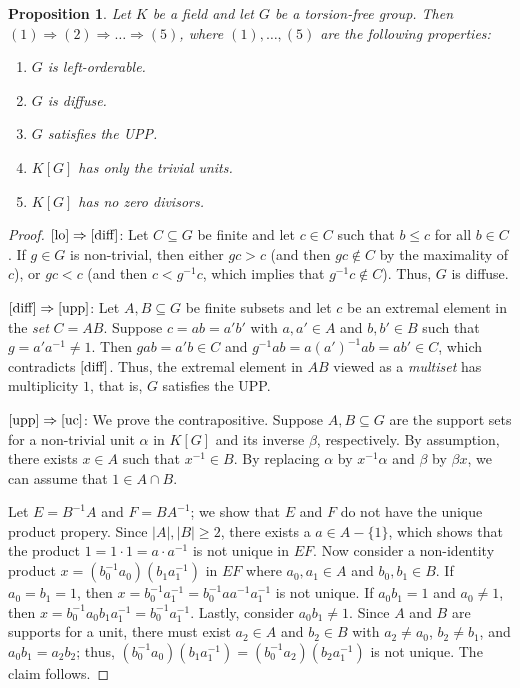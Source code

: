 \documentclass[11pt]{amsart}
\theoremstyle{mythm}
\newtheorem{proposition}[theorem]{Proposition}
\theoremstyle{mydef}
\theoremstyle{myrem}
\numberwithin{equation}{section}
\renewcommand{\leq}{\leqslant}
\renewcommand{\geq}{\geqslant}
\newcommand{\aaa}{\alpha}
\begin{document}
\begin{proposition}
\label{prop:chain}
Let $K$ be a field and let  $G$ be a torsion-free group. Then $(1)\Rightarrow (2)\Rightarrow \ldots\Rightarrow(5)$, where $(1),\ldots,(5)$ are the following properties:
\begin{enumerate}
\item \label{lo} $G$ is left-orderable.
\item \label{diff} $G$ is diffuse. 
\item \label{upp} $G$ satisfies the UPP. 
\item \label{uc} $K[G]$ has only the trivial units.
\item \label{zdc} $K[G]$ has no zero divisors.
\end{enumerate}					
\end{proposition}
\begin{proof} $\eqref{lo}\Rightarrow \eqref{diff}$: Let $C\subseteq G$ be finite and let $c\in C$ such that  $b\leq c$ for all $b\in C$. If $g\in G$ is non-trivial, then either $gc>c$ (and then $gc\notin C$ by the maximality of $c$), or $gc<c$ (and then $c<g^{-1}c$, which implies that $g^{-1}c\notin C$). Thus, $G$ is diffuse.

\noindent$\eqref{diff}\Rightarrow \eqref{upp}$: Let $A,B\subseteq G$ be finite subsets and let $c$ be an extremal element in the \emph{set} $C=AB$. Suppose $c=ab=a'b'$ with $a,a'\in A$ and $b,b'\in B$ such that $g=a'a^{-1}\ne 1$. Then $gab=a'b\in C$ and $g^{-1}ab=a(a')^{-1}ab=ab'\in C$, which contradicts $\eqref{diff}$. Thus, the extremal element in   $AB$ viewed as a  \emph{multiset} has multiplicity $1$, that is, $G$ satisfies the UPP.

   
   \noindent $\eqref{upp}\Rightarrow \eqref{uc}$: We prove the contrapositive.  Suppose $A,B\subseteq G$ are   the support sets for a non-trivial  unit $\aaa$ in $K[G]$ and its inverse $\beta$, respectively. By assumption, there exists $x\in A$ such that  $x^{-1} \in B$. By replacing $\aaa$ by $x^{-1}\aaa$ and  $\beta$ by $\beta x$, we can assume that $1\in A\cap B$. 
   
   Let $E=B^{-1}A$ and $F=BA^{-1}$; we show that $E$ and $F$ do not have the unique product propery. Since $|A|,|B|\geq 2$,  there exists a   $a\in A-\{1\}$, which shows that the product $1=1\cdot 1=a\cdot a^{-1}$ is not unique in $EF$. Now consider a non-identity product $x=( b_0^{-1} a_0 )(b_1 a_1^{-1}) $ in $EF$ where $a_0,a_1 \in A$ and $b_0,b_1\in B$. If $a_0=b_1=1$, then $x=b_0^{-1}a_1^{-1}=b_0^{-1}aa^{-1}a_1^{-1}$ is not unique. If $a_0b_1=1$ and $a_0\ne 1$, then $x= b_0^{-1}a_0b_1a_1^{-1}=b_0^{-1}a_1^{-1}$. Lastly, consider $a_0b_1\ne 1$. Since $A$ and $B$ are supports for a unit, there must exist $a_2\in A$ and $b_2\in B$ with $a_2\ne a_0$, $b_2\ne b_1$, and $a_0b_1=a_2b_2$; thus,  $ (b_0^{-1} a_0) (b_1 a_1^{-1}) =  (b_0^{-1} a_2) (b_2 a_1^{-1})$ is not unique. The claim follows.   
   

\end{proof}
\end{document}

